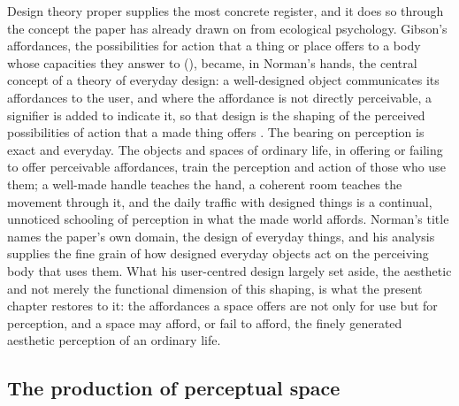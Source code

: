 Design theory proper supplies the most concrete register, and it does so through the concept the paper has already drawn on from ecological psychology. Gibson's affordances, the possibilities for action that a thing or place offers to a body whose capacities they answer to (), became, in Norman's hands, the central concept of a theory of everyday design: a well-designed object communicates its affordances to the user, and where the affordance is not directly perceivable, a signifier is added to indicate it, so that design is the shaping of the perceived possibilities of action that a made thing offers \parencite{gibson1979,norman2013}. The bearing on perception is exact and everyday. The objects and spaces of ordinary life, in offering or failing to offer perceivable affordances, train the perception and action of those who use them; a well-made handle teaches the hand, a coherent room teaches the movement through it, and the daily traffic with designed things is a continual, unnoticed schooling of perception in what the made world affords. Norman's title names the paper's own domain, the design of everyday things, and his analysis supplies the fine grain of how designed everyday objects act on the perceiving body that uses them. What his user-centred design largely set aside, the aesthetic and not merely the functional dimension of this shaping, is what the present chapter restores to it: the affordances a space offers are not only for use but for perception, and a space may afford, or fail to afford, the finely generated aesthetic perception of an ordinary life.

\subsection{The production of perceptual space}
\label{p23:sub:space-politicaleconomy}

